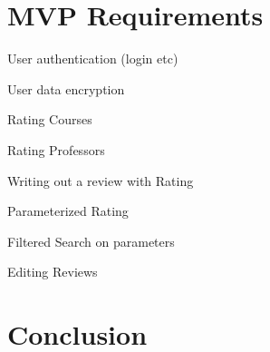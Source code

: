 \documentclass{article}
\begin{document}
\section{MVP Requirements}

	\quad User authentication (login etc)

	\quad User data encryption

	\quad Rating Courses

	\quad Rating Professors

	\quad Writing out a review with Rating

	\quad Parameterized Rating

	\quad Filtered Search on parameters	

	\quad Editing Reviews




\section{Conclusion}
\end{document}
